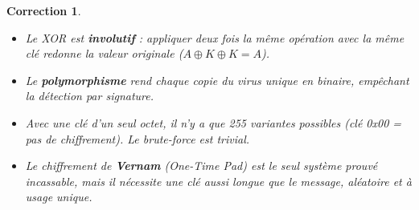 \documentclass[a4paper,11pt]{article}
\theoremstyle{plain}
\newtheorem{correction}{Correction}
\theoremstyle{definition}
\begin{document}
\begin{correction}
\begin{enumerate}
\begin{enumerate}
\end{enumerate}

\end{enumerate}

\begin{pointcle}
\begin{itemize}
    \item Le XOR est \textbf{involutif} : appliquer deux fois la même opération avec la même clé redonne la valeur originale ($A \oplus K \oplus K = A$).
    \item Le \textbf{polymorphisme} rend chaque copie du virus unique en binaire, empêchant la détection par signature.
    \item Avec une clé d'un seul octet, il n'y a que 255 variantes possibles (clé 0x00 = pas de chiffrement). Le brute-force est trivial.
    \item Le chiffrement de \textbf{Vernam} (One-Time Pad) est le seul système prouvé incassable, mais il nécessite une clé aussi longue que le message, aléatoire et à usage unique.
\end{itemize}
\end{pointcle}

\end{correction}

\bigskip

\end{document}
